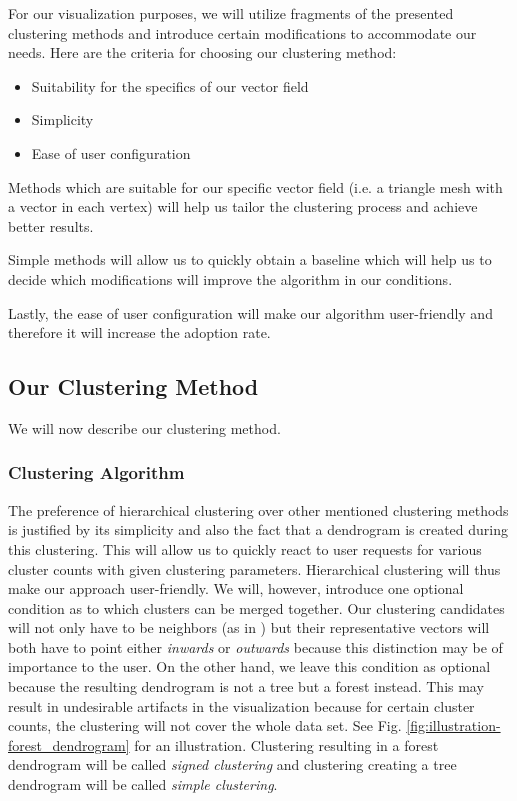 For our visualization purposes, we will utilize fragments of the presented clustering methods and introduce certain modifications to accommodate our needs. Here are the criteria for choosing our clustering method:

\begin{itemize}
\item Suitability for the specifics of our vector field
\item Simplicity
\item Ease of user configuration
\end{itemize}

Methods which are suitable for our specific vector field (i.e. a triangle mesh with a vector in each vertex) will help us tailor the clustering process and achieve better results. 

Simple methods will allow us to quickly obtain a baseline which will help us to decide which modifications will improve the algorithm in our conditions. 

Lastly, the ease of user configuration will make our algorithm user-friendly and therefore it will increase the adoption rate.

\subsection{Our Clustering Method}
\label{subsec:analysis-field_clustering-our_method}

We will now describe our clustering method.

\subsubsection{Clustering Algorithm}

The preference of hierarchical clustering over other mentioned clustering methods is justified by its simplicity and also the fact that a dendrogram is created during this clustering. This will allow us to quickly react to user requests for various cluster counts with given clustering parameters. Hierarchical clustering will thus make our approach user-friendly. We will, however, introduce one optional condition as to which clusters can be merged together. Our clustering candidates will not only have to be neighbors (as in \citet{Telea99}) but their representative vectors will both have to point either {\it inwards} or {\it outwards} because this distinction may be of importance to the user. On the other hand, we leave this condition as optional because the resulting dendrogram is not a tree but a forest instead. This may result in undesirable artifacts in the visualization because for certain cluster counts, the clustering will not cover the whole data set. See Fig. \ref{fig:illustration-forest_dendrogram} for an illustration. Clustering resulting in a forest dendrogram will be called {\it signed clustering} and clustering creating a tree dendrogram will be called {\it simple clustering}.

